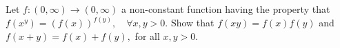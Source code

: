Let $ f: (0,\infty)\longrightarrow (0,\infty) $ a non-constant function having the property that $ f\left( x^y\right) = \left( f(x)\right)^{f(y)},\quad\forall x,y>0. $
Show that $ f(xy)=f(x)f(y) $ and $ f(x+y)=f(x)+f(y), $ for all $ x,y>0. $